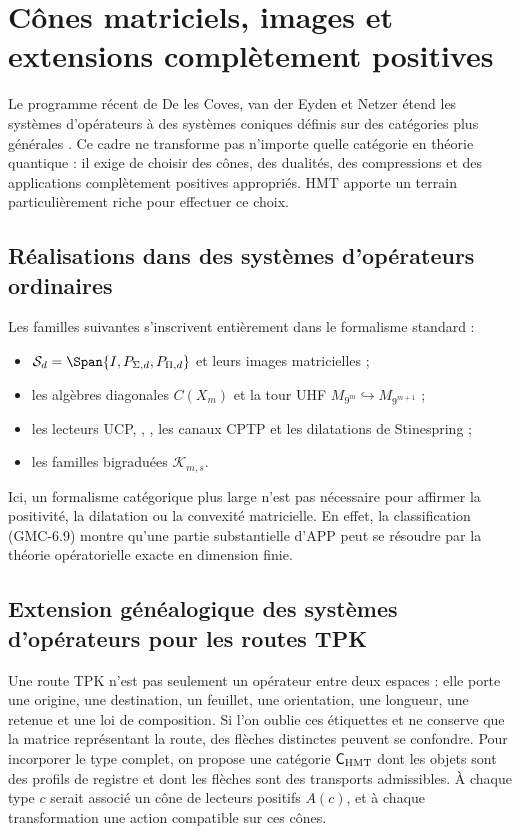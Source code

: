 \section{Cônes matriciels, images et extensions complètement positives}
\label{p12-83-c22-s5:gmc:chap:beyond}

Le programme récent de De les Coves, van der Eyden et Netzer étend les
systèmes d'opérateurs à des systèmes coniques définis sur des catégories plus
générales \citep{delescoves2026beyond}. Ce cadre ne transforme pas n'importe quelle
catégorie en théorie quantique : il exige de choisir des cônes, des dualités, des compressions et
des applications complètement positives appropriés. HMT apporte un terrain particulièrement
riche pour effectuer ce choix.

\subsection{Réalisations dans des systèmes d'opérateurs ordinaires}

Les familles suivantes s'inscrivent entièrement dans le formalisme standard :

\begin{itemize}
 \item $\mathcal S_d=\Span\{I,P_{\Sigma,d},P_{\Pi,d}\}$ et leurs images
 matricielles ;
 \item les algèbres diagonales $C(X_m)$ et la tour UHF
 $M_{9^m}\hookrightarrow M_{9^{m+1}}$ ;
 \item les lecteurs UCP, \POVM, \PVM, les canaux CPTP et les dilatations de
 Stinespring ;
 \item les familles bigraduées $\mathcal K_{m,s}$.
\end{itemize}

Ici, un formalisme catégorique plus large n'est pas nécessaire pour affirmer
la positivité, la dilatation ou la convexité matricielle. En effet, la classification
\textup{(GMC-6.9)} montre qu'une partie substantielle d'APP peut se résoudre par
la théorie opératorielle exacte en dimension finie.

\subsection{Extension généalogique des systèmes d'opérateurs pour les routes TPK}

Une route TPK n'est pas seulement un opérateur entre deux espaces : elle porte une origine, une destination,
un feuillet, une orientation, une longueur, une retenue et une loi de composition. Si l'on oublie
ces étiquettes et ne conserve que la matrice représentant la route,
des flèches distinctes peuvent se confondre. Pour incorporer le type complet, on propose
une catégorie $\mathsf C_{\rm HMT}$ dont les objets sont des profils de registre et
dont les flèches sont des transports admissibles. À chaque type $c$ serait associé un
cône de lecteurs positifs $A(c)$, et à chaque transformation une action
compatible sur ces cônes.


